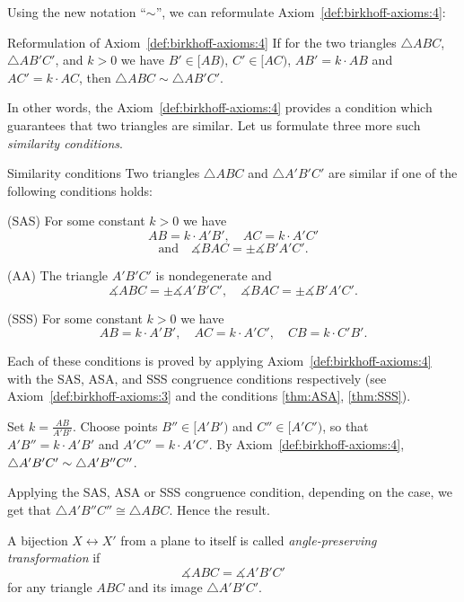 Using the new notation ``$\sim$'', we can reformulate Axiom~\ref{def:birkhoff-axioms:4}:

\begin{thm}{Reformulation of Axiom~\ref{def:birkhoff-axioms:4}}
If for the two triangles 
$\triangle ABC$, 
$\triangle AB'C'$,
and $k>0$ we have
$B'\in [AB)$,
$C'\in [AC)$,
$AB'=k\cdot AB$ and
$AC'=k\cdot AC$,
then $\triangle ABC\sim\triangle AB'C'$.
\end{thm}

In other words, the Axiom~\ref{def:birkhoff-axioms:4} provides 
a condition which guarantees that two triangles are similar.
Let us formulate three more such {}\emph{similarity conditions}.

\begin{thm}{Similarity conditions}\label{prop:sim}
Two triangles 
$\triangle ABC$ and $\triangle A'B'C'$
are similar if one of the following conditions holds:

(SAS) For some constant $k>0$ we have
$$A B=k\cdot A' B',
\quad 
A C=k\cdot A' C'$$
$$
\text{and}
\quad 
\measuredangle B A C=\pm\measuredangle B' A' C'.$$

(AA) The triangle $A' B' C'$ is nondegenerate
and 
$$\measuredangle A B C
=
\pm\measuredangle A' B' C',
\quad 
\measuredangle B A C
=
\pm\measuredangle B' A' C'.$$

(SSS) For some constant $k>0$ we have
$$A B=k\cdot A' B',
\quad
A C=k\cdot A' C',
\quad
CB=k\cdot C'B'.$$

\end{thm}

Each of these conditions is proved by applying Axiom~\ref{def:birkhoff-axioms:4} with the SAS, ASA, and SSS congruence conditions respectively
(see Axiom~\ref{def:birkhoff-axioms:3} and the conditions \ref{thm:ASA}, \ref{thm:SSS}).


Set $k=\tfrac{AB}{A'B'}$.
Choose points $B''\in [A'B')$ and $C''\in [A'C')$,
so that $A'B''=k\cdot A'B'$ and $A'C''=k\cdot A'C'$.
By Axiom~\ref{def:birkhoff-axioms:4},
$\triangle A'B'C'\z\sim \triangle A'B''C''$.

Applying the SAS, ASA or SSS congruence condition, depending on the case, 
we get that $\triangle A'B''C''\cong \triangle ABC$.
Hence the result.
\qeds



A bijection $X\leftrightarrow X'$ from a plane to itself is called \emph{angle-preserving transformation} if 
\[\measuredangle ABC= \measuredangle A'B'C'\]
for any triangle $ABC$ and its image $\triangle A'B'C'$.


